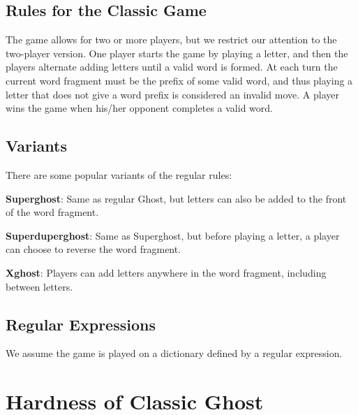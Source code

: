 \documentclass[runningheads,a4paper]{llncs}
\begin{document}
\subsection{Rules for the Classic Game}

	The game allows for two or more players, but we restrict our attention to the two-player version. One player starts the game by playing a letter, and then the players alternate adding letters until a valid word is formed. At each turn the current word fragment must be the prefix of some valid word, and thus playing a letter that does not give a word prefix is considered an invalid move. A player wins the game when his/her opponent completes a valid word. 

% 

\subsection{Variants}

There are some popular variants of the regular rules:

\textbf{Superghost}: Same as regular Ghost, but letters can also be added to the front of the word fragment.

\textbf{Superduperghost}: Same as Superghost, but before playing a letter, a player can choose to reverse the word fragment.

\textbf{Xghost}: Players can add letters anywhere in the word fragment, including between letters.

\subsection{Regular Expressions}

We assume the game is played on a dictionary defined by a regular expression. 

\section{Hardness of Classic Ghost}
\label{Hardness of Classic Ghost}
\end{document}
